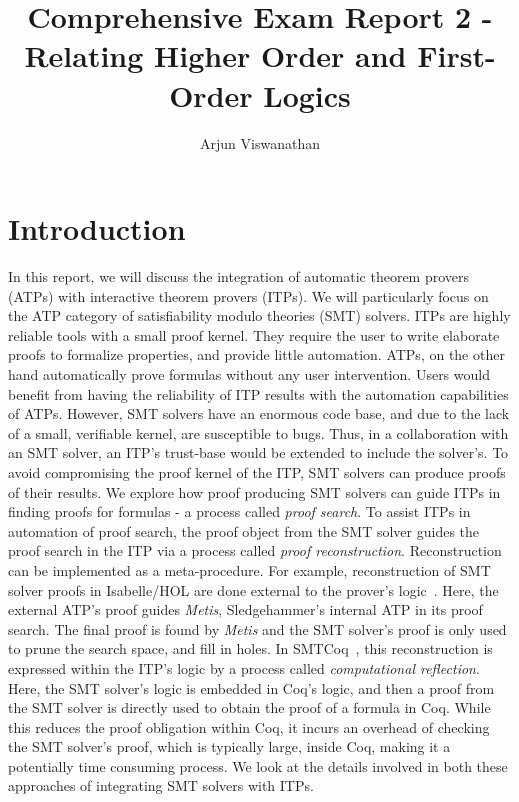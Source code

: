 \documentclass{article}
\begin{document}
	\title{Comprehensive Exam Report 2 - Relating Higher Order and First-Order Logics}
	\author{Arjun Viswanathan}
	\date{}
	\maketitle
	
	\section{Introduction}
	\label{sec:intro}
	In this report, we will discuss the 
	integration of automatic theorem provers 
	(ATPs) with interactive theorem 
	provers (ITPs). We will particularly
	focus on the ATP category of 
	satisfiability modulo theories (SMT) 
	solvers. ITPs are highly 
	reliable tools with a small proof kernel. 
	They require the user to write elaborate 
	proofs to formalize properties, and 
	provide little automation. ATPs, on the 
	other hand automatically prove formulas
	without any user intervention.  
	Users would benefit from having 
	the reliability of ITP results 
	with the automation capabilities
	of ATPs. However, SMT solvers have an 
	enormous code base, and due to the 
	lack of a small, verifiable kernel, 
	are susceptible to bugs. Thus, in a 
	collaboration with an SMT 
	solver, an ITP's trust-base would be 
	extended to include the solver's. To 
	avoid compromising the proof kernel of 
	the ITP, SMT solvers can 
	produce proofs of their results. 
	We explore how proof producing 
	SMT solvers can guide ITPs in 
	finding proofs for formulas - 
	a process called \textit{proof 
	search}. To assist ITPs in automation
	of proof search, the proof object from 
	the SMT solver guides the proof search 
	in the ITP via a process called
	\textit{proof reconstruction}.
	Reconstruction can be implemented 
	as a meta-procedure. For example, 
	reconstruction of SMT solver proofs 
	in Isabelle/HOL are done external to 
	the prover's logic~\cite{bohme}.
	Here, the external ATP's proof guides 
	\textit{Metis}, Sledgehammer's
	internal ATP in its proof search.
	The final proof is found by 
	\textit{Metis} and the SMT solver's 
	proof is only used to prune the 
	search space, and fill in holes.
	In SMTCoq~\cite{DBLP:phd/hal/Keller13},
	this reconstruction is 
	expressed within the ITP's logic 
	by a process called 
	\textit{computational reflection}.
	Here, the SMT solver's logic is 
	embedded in Coq's logic, and then 
	a proof from the SMT solver is 
	directly used to obtain the 
	proof of a formula in Coq. 
	While this reduces the 
	proof obligation within Coq, it incurs
	an overhead of checking the SMT 
	solver's proof, which is typically 
	large, inside Coq, making it a
	potentially time consuming process. 
	We look at the details involved in both 
	these approaches of integrating 
	SMT solvers with ITPs.
	
\end{document}
